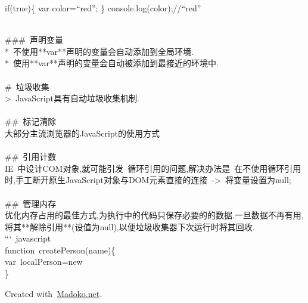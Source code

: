 \documentclass{article}
\begin{document}
\noindent if(true)\{
  var color=\textquotedblleft{}red\textquotedblright{};
\}
console.log(color);//\textquotedblleft{}red\textquotedblright{}%
\begin{mdpre}%
\noindent\\
\#\#\#~声明变量\\
*~不使用**var**声明的变量会自动添加到全局环境.\\
*~使用**var**声明的变量会自动被添加到最接近的环境中.\\
\\
\#~垃圾收集\\
\textgreater{}~JavaScript具有自动垃圾收集机制.\\
\\
\#\#~标记清除\\
大部分主流浏览器的JavaScript的使用方式\\
\\
\#\#~引用计数\\
IE~中设计COM对象,就可能引发~循环引用的问题,解决办法是~在不使用循环引用时,手工断开原生JavaScript对象与DOM元素直接的连接~-\textgreater{}~将变量设置为null;\\
\\
\#\#~管理内存\\
优化内存占用的最佳方式,为执行中的代码只保存必要的的数据.一旦数据不再有用,将其**解除引用**(设值为null),以便垃圾收集器下次运行时将其回收.\\
```~javascript\\
function~createPerson(name)\{\\
var~localPerson=new~\\
\}%
\end{mdpre}
\begin{mdbmargintb}{4em}{}%
\begin{mdflushright}%
{\tiny Created with~\href{https://www.madoko.net}{Madoko.net}.}%
\end{mdflushright}%
\end{mdbmargintb}%
\end{document}
